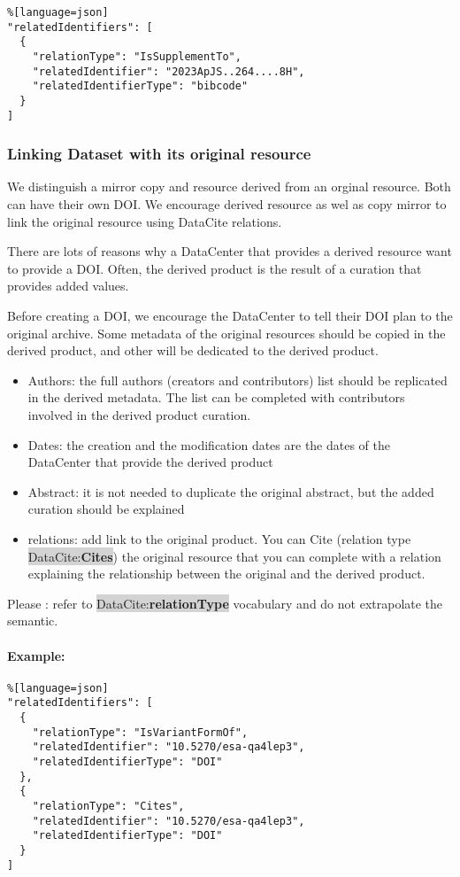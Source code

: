 \documentclass[11pt,a4paper]{ivoa}
\newcommand{\dataciteterm}[1]{\colorbox{lightgray}{DataCite:\textbf{#1}}}
\begin{document}
\begin{lstlisting}%[language=json]
"relatedIdentifiers": [
  {
    "relationType": "IsSupplementTo",
    "relatedIdentifier": "2023ApJS..264....8H",
    "relatedIdentifierType": "bibcode"
  }
]
\end{lstlisting}

\subsubsection{Linking Dataset with its original resource}
We distinguish a mirror copy and resource derived from an orginal resource.
Both can have their own DOI. We encourage derived resource as wel as copy mirror to link the original resource using DataCite relations.

There are lots of reasons why a DataCenter that provides a derived resource want to provide a DOI. 
Often, the derived product is the result of a curation that provides added values.

Before creating a DOI, we encourage the DataCenter to tell their DOI plan to the original archive.
Some metadata of the original resources should be copied in the derived product, and other will be dedicated to the derived product.

\begin{itemize}
\item Authors: the full authors (creators and contributors) list should be replicated in the derived metadata. The list can be completed with contributors involved in the derived product curation.
\item Dates: the creation and the modification dates are the dates of the DataCenter that provide the derived product
\item Abstract: it is not needed to duplicate the original abstract, but the added curation should be explained
\item relations: add link to the original product. 
You can Cite (relation type \dataciteterm{Cites}) the original resource that you can complete with a relation explaining the relationship between the original and the derived product.
\end{itemize}

Please : refer to \dataciteterm{relationType} vocabulary and do not extrapolate the semantic.



\paragraph{Example:}
\begin{lstlisting}%[language=json]
"relatedIdentifiers": [
  {
    "relationType": "IsVariantFormOf",
    "relatedIdentifier": "10.5270/esa-qa4lep3",
    "relatedIdentifierType": "DOI"
  },
  {
    "relationType": "Cites",
    "relatedIdentifier": "10.5270/esa-qa4lep3",
    "relatedIdentifierType": "DOI"
  }
]
\end{lstlisting}
\end{document}
